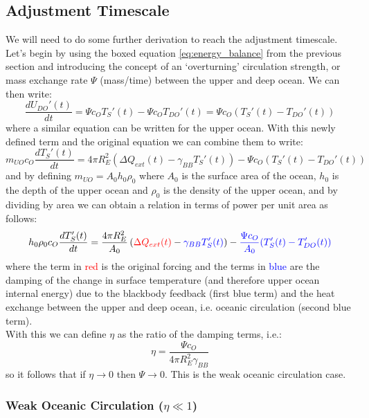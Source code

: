 \subsection{Adjustment Timescale}
\label{sec:adjustment-timescale}

We will need to do some further derivation to reach the adjustment timescale. 
Let's begin by using the boxed equation \ref{eq:energy_balance} from the previous
section and introducing the concept of an `overturning' circulation strength, or
mass exchange rate $\Psi$ (mass/time) between the upper and deep ocean. We can 
then write:
$$
\frac{dU_{DO}'(t)}{dt} = \Psi c_O T_S'(t) - \Psi c_O T_{DO}'(t) = 
\Psi c_O (T_S'(t) - T_{DO}'(t))
$$
where a similar equation can be written for the upper ocean. With this newly
defined term and the original equation we can combine them to write:
$$
m_{UO}c_O \frac{dT_S'(t)}{dt} = 4 \pi R_E^2 \left(\Delta Q_{ext}(t) - 
\gamma_{BB} T_S'(t)\right) - \Psi c_O (T_S'(t) - T_{DO}'(t))
$$
and by defining $m_{UO} = A_0h_0\rho_0$ where $A_0$ is the surface area of the
ocean, $h_0$ is the depth of the upper ocean and $\rho_0$ is the density of the
upper ocean, and by dividing by area we can obtain a relation in terms of power
per unit area as follows:
$$
h_0 \rho_0 c_O \frac{dT_S'(t)}{dt} = \frac{4 \pi R_E^2}{A_0} \left(
\textcolor{red}{\Delta Q_{ext}(t)} - \textcolor{blue}{\gamma_{BB} T_S'(t)}\right)
- \textcolor{blue}{\frac{\Psi c_O}{A_0} (T_S'(t) - T_{DO}'(t))}
$$
where the term in \textcolor{red}{red} is the original forcing and the terms
in \textcolor{blue}{blue} are the damping of the change in surface temperature
(and therefore upper ocean internal energy) due to the blackbody feedback (first
blue term) and the heat exchange between the upper and deep ocean, i.e. oceanic
circulation (second blue term).\\

With this we can define $\eta$ as the ratio of the damping terms, i.e.:
$$
\eta = \frac{\Psi c_O}{4\pi R_E^2 \gamma_{BB}}
$$
so it follows that if $\eta \rightarrow 0$ then $\Psi \rightarrow 0$. This is
the weak oceanic circulation case.

\subsubsection{Weak Oceanic Circulation ($\eta \ll 1$)}
\label{sec:weak-oceanic-circulation}

